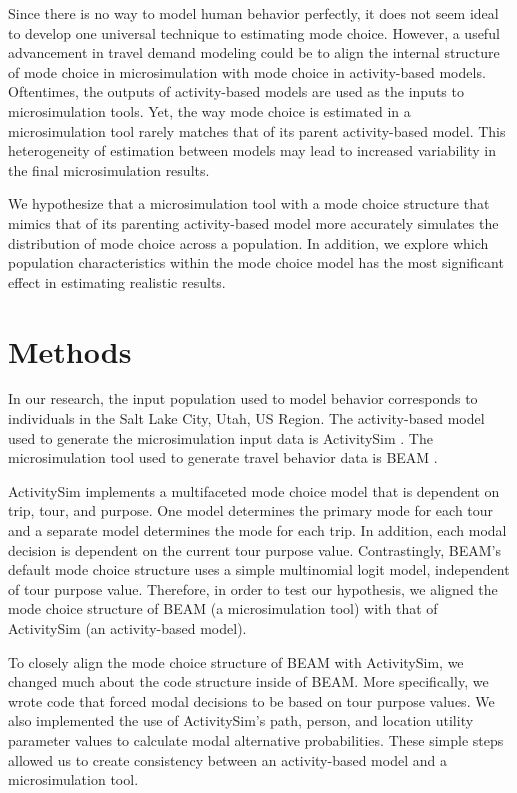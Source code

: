 \documentclass[3p, authoryear]{elsarticle} %
\begin{document}
Since there is no way to model human behavior perfectly, it does not seem ideal to develop one universal technique to estimating mode choice. However, a useful advancement in travel demand modeling could be to align the internal structure of mode choice in microsimulation with mode choice in activity-based models. Oftentimes, the outputs of activity-based models are used as the inputs to microsimulation tools. Yet, the way mode choice is estimated in a microsimulation tool rarely matches that of its parent activity-based model. This heterogeneity of estimation between models may lead to increased variability in the final microsimulation results.

We hypothesize that a microsimulation tool with a mode choice structure that mimics that of its parenting activity-based model more accurately simulates the distribution of mode choice across a population. In addition, we explore which population characteristics within the mode choice model has the most significant effect in estimating realistic results.

\hypertarget{methods}{%
\section{Methods}\label{methods}}

In our research, the input population used to model behavior corresponds to individuals in the Salt Lake City, Utah, US Region. The activity-based model used to generate the microsimulation input data is ActivitySim \citep{activitysim}. The microsimulation tool used to generate travel behavior data is BEAM \citep{beam}.

ActivitySim implements a multifaceted mode choice model that is dependent on trip, tour, and purpose. One model determines the primary mode for each tour and a separate model determines the mode for each trip. In addition, each modal decision is dependent on the current tour purpose value. Contrastingly, BEAM's default mode choice structure uses a simple multinomial logit model, independent of tour purpose value. Therefore, in order to test our hypothesis, we aligned the mode choice structure of BEAM (a microsimulation tool) with that of ActivitySim (an activity-based model).

To closely align the mode choice structure of BEAM with ActivitySim, we changed much about the code structure inside of BEAM. More specifically, we wrote code that forced modal decisions to be based on tour purpose values. We also implemented the use of ActivitySim's path, person, and location utility parameter values to calculate modal alternative probabilities. These simple steps allowed us to create consistency between an activity-based model and a microsimulation tool.
\end{document}
